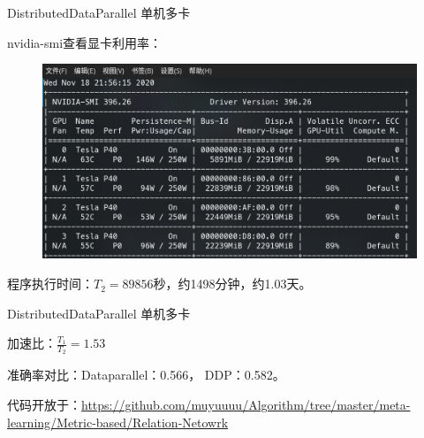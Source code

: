\documentclass[algorithm,pgfplots]{cuzbeamer}
\begin{document}
    \begin{frame}{DistributedDataParallel 单机多卡}
        \begin{leftbar}
            {\ttfamily nvidia-smi}查看显卡利用率：
        \end{leftbar}
        \begin{figure}
            \includegraphics[scale=0.45]{figure/ddp.png}
        \end{figure}
        程序执行时间：$T_2=89856$秒，约1498分钟，约1.03天。
    \end{frame}

    \begin{frame}{DistributedDataParallel 单机多卡}
        \begin{leftbar}
            加速比：$\frac{T_1}{T_2}=1.53$
        \end{leftbar}
        \begin{leftbar}
            准确率对比：Dataparallel：0.566， DDP：0.582。
        \end{leftbar}
        \begin{leftbar}
            代码开放于：{\ttfamily \url{https://github.com/muyuuuu/Algorithm/tree/master/meta-learning/Metric-based/Relation-Netowrk}}
        \end{leftbar}
    \end{frame}
\end{document}
